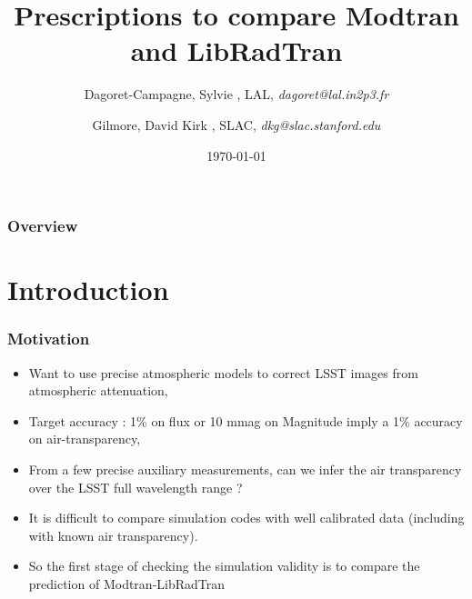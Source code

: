 \documentclass{beamer}
\title[MT-RT Comparison]{Prescriptions to compare Modtran and LibRadTran} %
\author{
Dagoret-Campagne, Sylvie  ,  LAL, %
\textit{dagoret@lal.in2p3.fr} %
\\
\and
Gilmore, David Kirk , SLAC,
\textit{dkg@slac.stanford.edu} %
}
\date{\today} %
\begin{document}
\begin{frame}
\titlepage %
\end{frame}

\begin{frame}
\frametitle{Overview} %
\tableofcontents %
\end{frame}



\section{Introduction}

\begin{frame}
\frametitle{Motivation}
\begin{itemize}
\item Want to use precise atmospheric models to correct LSST images from atmospheric attenuation,
\item Target accuracy : 1\% on flux or 10 mmag on Magnitude imply a 1\% accuracy on air-transparency,
\item From a few precise auxiliary measurements, can we infer the air transparency over the LSST full wavelength range ?
\item It is difficult to compare simulation codes with well calibrated data (including with known air  transparency).
\item So the first stage of checking the simulation validity is to compare the prediction of Modtran-LibRadTran
\end{itemize}
\end{frame}
\end{document}
